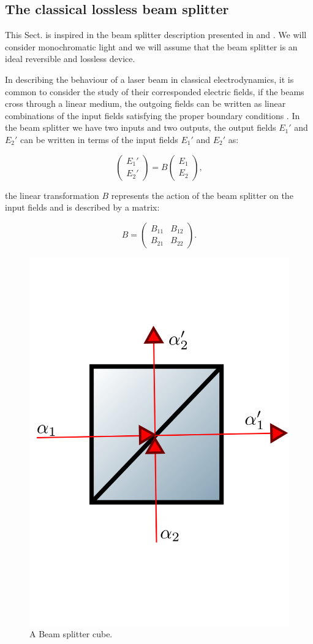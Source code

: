 \documentclass[12pt]{book}
\begin{document}
\subsection{The  classical lossless beam splitter}

This Sect. is inspired in the beam splitter description presented in \cite{ludon} and \cite{leonhardt}. We will consider monochromatic light and we will assume that the beam splitter is an ideal reversible and lossless device.


In describing the behaviour of a laser beam in classical electrodynamics, it is common to consider the study of their corresponded electric fields, if the beams cross through a linear medium, the outgoing fields can be written as linear combinations of the input fields satisfying the proper boundary conditions \cite{jackson}. In the beam splitter we have two inputs and two outputs, the output fields $E_{1}'$ and $E_{2}'$  can be written in terms of the input fields $E_{1}'$ and $E_{2}'$ as:

\begin{equation}
\begin{pmatrix} E_{1}' \\ E_{2}' \end{pmatrix}=B\begin{pmatrix} E_{1} \\ E_{2} \end{pmatrix},\label{rule}
\end{equation}

the linear transformation $B$ represents the action of the beam splitter on the input fields and is described by a matrix:

\begin{equation}
B=\begin{pmatrix} B_{11}& B_{12} \\B_{21} & B_{22} \end{pmatrix}.
\end{equation}

\begin{figure}[t!]
\centering
\includegraphics[width=5 cm,height=5 cm]{images/bS.png}
\caption{A Beam splitter cube.}
\label{fig:BS}
\end{figure}
\end{document}
